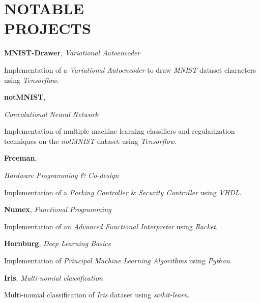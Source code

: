 \documentclass[margin, 10pt]{res} %
\begin{document}
\section{NOTABLE \\ PROJECTS}

\textbf{MNIST-Drawer}, 
\textit{Variational Autoencoder}
\begin{innerlist}
	\item Implementation of a \textit{Variational Autoencoder} to draw \textit{MNIST} dataset characters using \textit{Tensorflow}. \href{https://github.com/aligholamee/MNIST-Drawer}{\UrlFont[code]}
\end{innerlist}

\textbf{notMNIST}, 
{\textit{Convolutional Neural Network}
	\begin{innerlist}
		\item Implementation of multiple machine learning classifiers and regularization techniques on the \textit{notMNIST} dataset using \textit{Tensorflow}. \href{https://github.com/aligholamee/notMNIST}{\UrlFont[code]}
	\end{innerlist}

	\textbf{Freeman}, 
	{\textit{Hardware Programming \& Co-design}
		\begin{innerlist}
			\item Implementation of a \textit{Parking Controller} \& \textit{Security Controller} using \textit{VHDL}. \href{https://github.com/aligholamee/Freeman}{\UrlFont[code]}
		\end{innerlist}
		
		\textbf{Numex}, 
		\textit{Functional Programming}
		\begin{innerlist}
			\item Implementation of an \textit{Advanced Functional Interpreter} using \textit{Racket}. \href{https://github.com/aligholamee/NUMEX}{\UrlFont[code]}
		\end{innerlist}
		
		\textbf{Hornburg}, 
		\textit{Deep Learning Basics}
		\begin{innerlist}
			\item Implementation of \textit{Principal Machine Learning Algorithms} using \textit{Python}. \href{https://github.com/aligholamee/Hornburg}{\UrlFont[code]}
		\end{innerlist}
		
		\textbf{Iris}, 
		\textit{Multi-nomial classification}
		\begin{innerlist}
			\item Multi-nomial classification of \textit{Iris} dataset using \textit{scikit-learn}. \href{https://github.com/aligholamee/IRIS}{\UrlFont[code]}
		\end{innerlist}
	
}}
\end{document}
